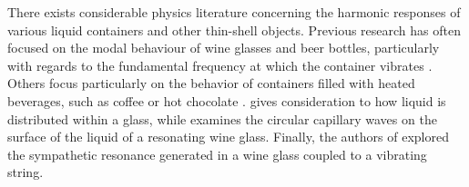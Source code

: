 \documentclass[twoside,a4paper]{article}
\begin{document}
There exists considerable physics literature concerning the harmonic
responses of various liquid containers and other thin-shell objects.
Previous research has often focused on the modal behaviour of wine
glasses and beer bottles, particularly with regards to the fundamental
frequency at which the container vibrates \cite{russelBEER,french1983vino,
chen2005does,rossing1990wine,jundt2006vibrational}. Others focus particularly
on the behavior of containers filled with heated beverages, such as
coffee or hot chocolate \cite{crawford1982hot,morrison2002sound,
morrison2014acoustics}.
\cite{courtois2008tuning} gives consideration to how liquid is distributed
within a glass, while \cite{apfel1982whispering} examines the circular
capillary waves on the surface of the liquid of a resonating wine glass.
Finally, the authors of \cite{arbel2017wine} explored the sympathetic
resonance generated in a wine glass coupled to a vibrating string.

\end{document}

